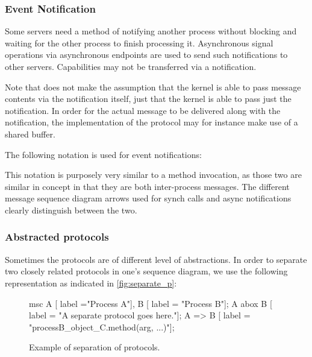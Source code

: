 \subsubsection*{Event Notification}   

Some servers need a method of notifying another process without blocking and
waiting for the other process to finish processing it. Asynchronous signal
operations via asynchronous endpoints are used to send such notifications to
other servers. Capabilities may not be transferred via a notification.

Note that  does not make the assumption that the kernel is able to pass
message contents via the notification itself, just that the kernel is able
to pass just the notification. In order for the actual message to be delivered
along with the notification, the implementation of the protocol may for instance
make use of a shared buffer.

The following notation is used for event notifications:

\begin{center}
\end{center}

This notation is purposely very similar to a method invocation, as those
two are similar in concept in that they are both inter-process messages.
The different message sequence diagram arrows used for synch calls
and async notifications clearly distinguish between the two.

\subsubsection*{Abstracted protocols}

Sometimes the protocols are of different level of abstractions. In order to
separate two closely related protocols in one's sequence diagram, we use the
following representation as indicated in \autoref{fig:separate_p}:

\begin{figure}[htb]
  \centering
  \begin{msc}
    msc {
      A [ label ="Process A"],
      B [ label = "Process B"];
      A abox B [ label = "A separate protocol goes here."];
      A => B [ label = "processB\_object\_C.method(arg, ...)"];
    }
  \end{msc}
  \caption{Example of separation of protocols.}
  \label{fig:separate_p}
\end{figure}

